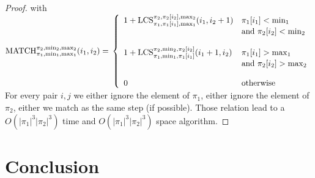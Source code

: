 \documentclass[a4paper]{llncs}
\DeclareMathOperator{\LCSa}{LCS}
\newcommand{\LCS}[8]{\LCSa_{{#1},{#2},{#3}}^{{#4},{#5},{#6}}({#7},{#8})}
\DeclareMathOperator{\matcha}{MATCH}
\newcommand{\match}[8]{\matcha_{{#1},{#2},{#3}}^{{#4},{#5},{#6}}({#7},{#8})}
\begin{document}
\begin{proof}
	with
	$\match{\pi_1}{\min_1}{\max_1}{\pi_2}{\min_2}{\max_2}{i_1}{i_2}=\\ \left\{ 
				\begin{array}{l l}
					1+\LCS{\pi_1}{\pi_1[i_1]}{\max_1}{\pi_2}{\pi_2[i_2]}{\max_2}{i_1}{i_2+1} & \text{$\pi_1[i_1]<\min_1$ } \\
					& \text{and $\pi_2[i_2]<\min_2$} \\
					&\\
					1+\LCS{\pi_1}{\min_1}{\pi_1[i_1]}{\pi_2}{\min_2}{\pi_2[i_2]}{i_1+1}{i_2}
					 & \text{$\pi_1[i_1]>\max_1$ } \\	
					&\text{and $\pi_2[i_2]>\max_2$}\\	
					&\\	
					0 & \text{otherwise}\\							
				\end{array} \right.$\\
				
	For every pair $i,j$ we either ignore the element of $\pi_1$,
	either ignore the element of $\pi_2$, 
	either we match as the same step (if possible).
	Those relation lead to a $O(|\pi_1|^3|\pi_2|^3)$ time and $O(|\pi_1|^3|\pi_2|^3)$ space algorithm.		
	\end{proof}


			
%		
%		
	
	
		
	\section{Conclusion}
		


		  					
{}
	
			
				      
\end{document}

